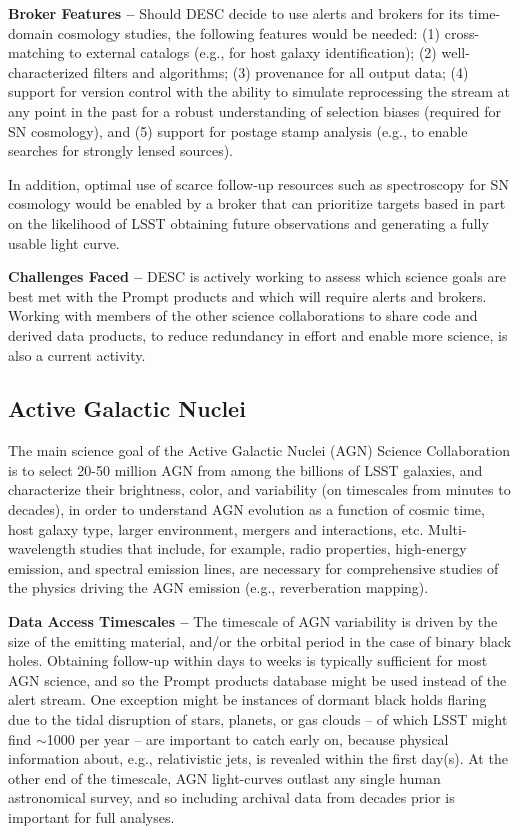 {\bf Broker Features --}
Should DESC decide to use alerts and brokers for its time-domain cosmology studies, the following features would be needed:
(1) cross-matching to external catalogs (e.g., for host galaxy identification);
(2) well-characterized filters and algorithms;
(3) provenance for all output data;
(4) support for version control with the ability to simulate reprocessing the stream at any point in the past for a robust understanding of selection biases (required for SN cosmology), and
(5) support for postage stamp analysis (e.g., to enable searches for strongly lensed sources).

In addition, optimal use of scarce follow-up resources such as spectroscopy for SN cosmology would be enabled by a broker that can prioritize targets based in part on the likelihood of LSST obtaining future observations and generating a fully usable light curve.

{\bf Challenges Faced --}
DESC is actively working to assess which science goals are best met with the Prompt products and which will require alerts and brokers.
Working with members of the other science collaborations to share code and derived data products, to reduce redundancy in effort and enable more science, is also a current activity. 

\subsection{Active Galactic Nuclei}\label{ssec:sci_agn}

The main science goal of the Active Galactic Nuclei (AGN) Science Collaboration is to select 20-50 million AGN from among the billions of LSST galaxies, and characterize their brightness, color, and variability (on timescales from minutes to decades), in order to understand AGN evolution as a function of cosmic time, host galaxy type, larger environment, mergers and interactions, etc.
Multi-wavelength studies that include, for example, radio properties, high-energy emission, and spectral emission lines, are necessary for comprehensive studies of the physics driving the AGN emission (e.g., reverberation mapping).

{\bf Data Access Timescales --} 
The timescale of AGN variability is driven by the size of the emitting material, and/or the orbital period in the case of binary black holes. 
Obtaining follow-up within days to weeks is typically sufficient for most AGN science, and so the Prompt products database might be used instead of the alert stream.
One exception might be instances of dormant black holds flaring due to the tidal disruption of stars, planets, or gas clouds -- of which LSST might find $\sim$1000 per year -- are important to catch early on, because physical information about, e.g., relativistic jets, is revealed within the first day(s).
At the other end of the timescale, AGN light-curves outlast any single human astronomical survey, and so including archival data from decades prior is important for full analyses. 

